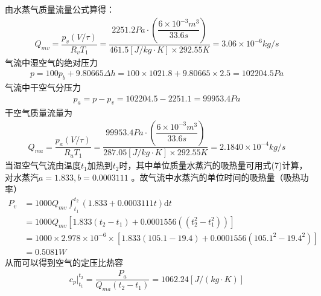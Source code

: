 \documentclass[UTF8,a4paper,10pt]{ctexart}
\def \d {\mathrm{d}}
\begin{document}
	
	由水蒸气质量流量公式算得：
	\begin{align}
	Q_{mv}=\dfrac{p_{v}(V/\tau)}{R_{v}T_{1}}=\dfrac{2251.2Pa\cdot\left(\dfrac{6\times10^{-3}m^{3}}{33.6s}\right)}{461.5[J/kg\cdot K]\times 292.55K}=3.06\times10^{-6}kg/s
	\end{align}
	气流中湿空气的绝对压力
	\begin{align}
	p=100p_{b}+9.80665\Delta h=100\times 1021.8+9.80665\times2.5=102204.5Pa
	\end{align}
	气流中干空气分压力
	\begin{align}
	p_{a}=p-p_{v}=102204.5-2251.1=99953.4Pa
	\end{align}
	干空气质量流量为
	\begin{align}
	Q_{ma}=\dfrac{p_{a}(V/\tau)}{R_{a}T_{1}}=\dfrac{99953.4Pa\cdot\left(\dfrac{6\times10^{-3}m^{3}}{33.6s}\right)}{287.05[J/kg\cdot K]\times 292.55K}=2.1840\times 10^{-4}kg/s
	\end{align}
	当湿空气气流由温度$t_{1}$加热到$t_{2}$时，其中单位质量水蒸汽的吸热量可用式(7)计算，对水蒸汽$a=1.833,b=0.0003111$ 。故气流中水蒸汽的单位时间的吸热量（吸热功率）
	\begin{equation}
	\begin{split}
	P_{v}
	& =1000Q_{mv}\int_{t_{1}}^{t_{2}}(1.833+0.0003111t)\d t\\
	& =1000Q_{mv}\left[1.833(t_{2}-t_{1})+0.0001556((t_{2}^{2}-t_{1}^{2}))\right]\\
	& =1000 \times 2.978 \times 10^{-6}\times[1.833(105.1-19.4)+0.0001556(105.1^{2}-19.4^{2})]\\
	& =0.5081W
	\end{split}
	\end{equation}
	从而可以得到空气的定压比热容
	\begin{align}
	c_{p}\big| ^{t_{2}}_{t_{1}}=\dfrac{P_{a}}{Q_{ma}(t_{2}-t_{1})}=1062.24[J/(kg\cdot K)]
		\end{align}
		
\end{document}

